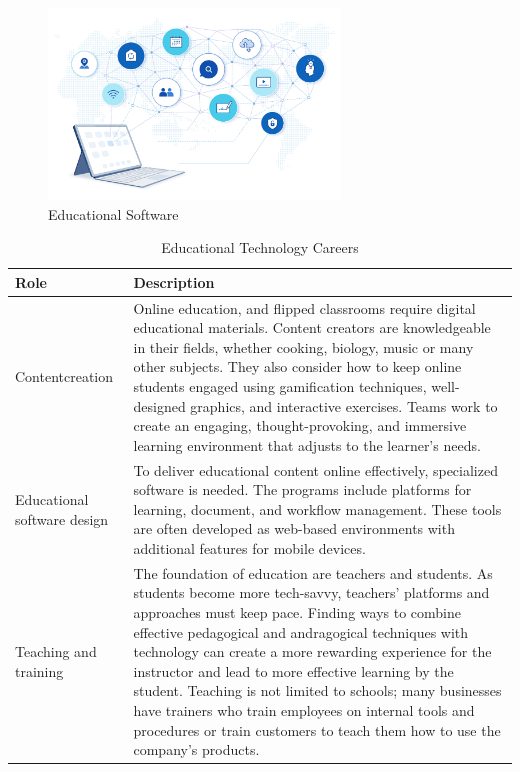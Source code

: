 \begin{figure}[H]
	\begin{center}
		\caption{Educational Software}
		\vskip 4pt
		\includegraphics[height=2in]{images/careers/iStock-1360633055.small.jpg}
	\end{center}
\end{figure}

\begin{table}[H]
	\begin{center}
		\caption{Educational Technology Careers}
		\vskip 4pt
		\begin{tabular}{p{1in}|p{3.4in}} 
			\textbf{Role} & \textbf{Description}\\
			\hline
			Content\linebreak creation & Online education, and flipped classrooms require digital educational materials. Content creators are knowledgeable in their fields, whether cooking, biology, music or many other subjects. They also consider how to keep online students engaged using gamification techniques, well-designed graphics, and interactive exercises. Teams work to create an engaging, thought-provoking, and immersive learning environment that adjusts to the learner's needs.\\
			\hline
			Educational software design & To deliver educational content online effectively, specialized software is needed. The programs include platforms for learning, document, and workflow management. These tools are often developed as web-based environments with additional features for mobile devices.\\
			\hline
			Teaching and training & The foundation of education are teachers and students. As students become more tech-savvy, teachers' platforms and approaches must keep pace. Finding ways to combine effective pedagogical and andragogical techniques with technology can create a more rewarding experience for the instructor and lead to more effective learning by the student. Teaching is not limited to schools; many businesses have trainers who train employees on internal tools and procedures or train customers to teach them how to use the company's products.\\
			\hline
		\end{tabular}
	\end{center}
\end{table}

